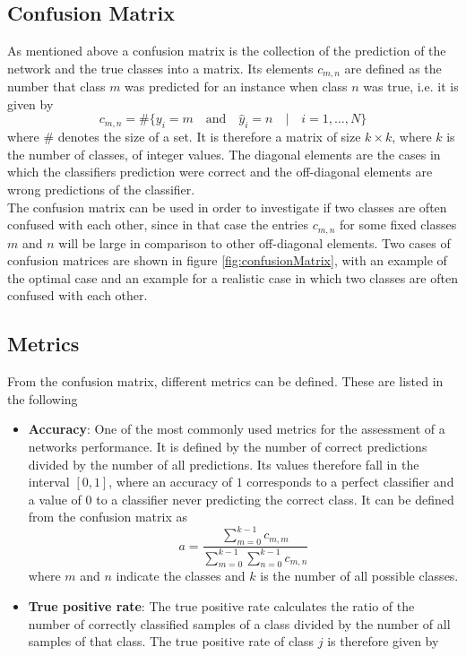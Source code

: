 \subsection{Confusion Matrix}

As mentioned above a confusion matrix is the collection of the prediction of the network and the true classes into a matrix. Its elements $c_{m,n}$ are defined as the number that class $m$ was predicted for an instance when class $n$ was true, i.e. it is given by
\begin{equation}
c_{m,n} = \# \{y_i = m \quad \textrm{and} \quad \hat{y}_i = n \quad | \quad i=1,\dots,N  \}
\end{equation}
where $\#$ denotes the size of a set. It is therefore a matrix of size $k\times k$, where $k$ is the number of classes, of integer values. The diagonal elements are the cases in which the classifiers prediction were correct and the off-diagonal elements are wrong predictions of the classifier. \\

The confusion matrix can be used in order to investigate if two classes are often confused with each other, since in that case the entries $c_{m,n}$ for some fixed classes $m$ and $n$ will be large in comparison to other off-diagonal elements. Two cases of confusion matrices are shown in figure \ref{fig:confusionMatrix}, with an example of the optimal case and an example for a realistic case in which two classes are often confused with each other. \\

\subsection{Metrics}

From the confusion matrix, different metrics can be defined. These are listed in the following
\begin{itemize}[label={}]
\item \textbf{Accuracy}: One of the most commonly used metrics for the assessment of a networks performance. It is defined by the number of correct predictions divided by the number of all predictions. Its values therefore fall in the interval $[0,1]$, where an accuracy of $1$ corresponds to a perfect classifier and a value of $0$ to a classifier never predicting the correct class. It can be defined from the confusion matrix as 
\begin{equation}
a = \frac{\sum_{m=0}^{k-1} c_{m,m}}{\sum_{m=0}^{k-1} \sum_{n=0}^{k-1} c_{m,n}}
\end{equation} 
where $m$ and $n$ indicate the classes and $k$ is the number of all possible classes.
\item \textbf{True positive rate}: The true positive rate calculates the ratio of the number of correctly classified samples of a class divided by the number of all samples of that class. The true positive rate of class $j$ is therefore given by

\end{itemize}



